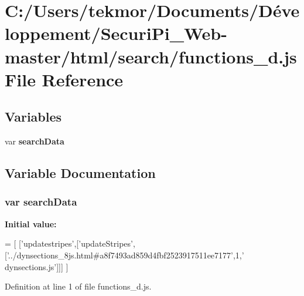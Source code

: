 \section{C\+:/\+Users/tekmor/\+Documents/\+Développement/\+Securi\+Pi\+\_\+\+Web-\/master/html/search/functions\+\_\+d.js File Reference}
\label{functions__d_8js}
\subsection*{Variables}
\begin{DoxyCompactItemize}
\item 
var {\bf search\+Data}
\end{DoxyCompactItemize}


\subsection{Variable Documentation}
\subsubsection[{search\+Data}]{\setlength{\rightskip}{0pt plus 5cm}var search\+Data}\label{functions__d_8js_ad01a7523f103d6242ef9b0451861231e}
{\bfseries Initial value\+:}
\begin{DoxyCode}
=
[
  [\textcolor{stringliteral}{'updatestripes'},[\textcolor{stringliteral}{'updateStripes'},[\textcolor{stringliteral}{'../dynsections\_8js.html#a8f7493ad859d4fbf2523917511ee7177'},1,\textcolor{stringliteral}{'
      dynsections.js'}]]]
]
\end{DoxyCode}


Definition at line 1 of file functions\+\_\+d.\+js.

